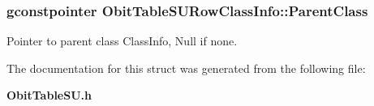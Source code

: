 \subsubsection{\setlength{\rightskip}{0pt plus 5cm}gconstpointer {\bf Obit\-Table\-SURow\-Class\-Info::Parent\-Class}}\label{structObitTableSURowClassInfo_o3}


Pointer to parent class Class\-Info, Null if none. 



The documentation for this struct was generated from the following file:\begin{CompactItemize}
\item 
{\bf Obit\-Table\-SU.h}\end{CompactItemize}

